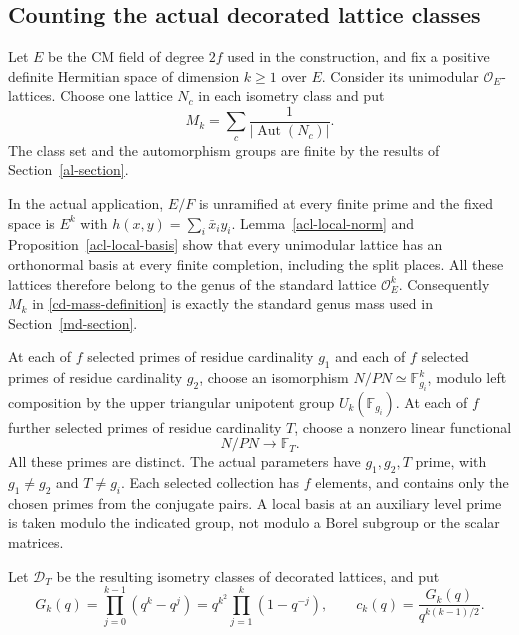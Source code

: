 \subsection{Counting the actual decorated lattice classes}

Let $E$ be the CM field of degree $2f$ used in the construction,
and fix a positive definite Hermitian space of dimension $k\ge1$
over $E$. Consider its unimodular $\mathcal O_E$-lattices.
Choose one lattice $N_c$ in each isometry class and put
\begin{equation}\label{cd-mass-definition}
                   M_k=\sum_c\frac1{|\operatorname{Aut}(N_c)|}.
\end{equation}
The class set and the automorphism groups are finite by the
results of Section~\ref{al-section}.

In the actual application, $E/F$ is unramified at every finite
prime and the fixed space is $E^k$ with
$h(x,y)=\sum_i\bar x_i y_i$. Lemma~\ref{acl-local-norm} and
Proposition~\ref{acl-local-basis} show that every unimodular
lattice has an orthonormal basis at every finite completion,
including the split places. All these lattices therefore belong
to the genus of the standard lattice $\mathcal O_E^k$.
Consequently $M_k$ in \eqref{cd-mass-definition} is exactly
the standard genus mass used in Section~\ref{md-section}.

At each of $f$ selected primes of residue cardinality $g_1$ and
each of $f$ selected primes of residue cardinality $g_2$, choose
an isomorphism $N/PN\simeq\mathbb F_{g_i}^{k}$, modulo left
composition by the upper triangular unipotent group
$U_k(\mathbb F_{g_i})$. At each of $f$ further selected primes
of residue cardinality $T$, choose a nonzero linear functional
\[
                         N/PN\longrightarrow\mathbb F_T.
\]
All these primes are distinct. The actual parameters have
$g_1,g_2,T$ prime, with $g_1\ne g_2$ and $T\ne g_i$.
Each selected collection has $f$ elements, and contains only
the chosen primes from the conjugate pairs. A local basis at an
auxiliary level prime is taken modulo the indicated group, not
modulo a Borel subgroup or the scalar matrices.

Let $\mathcal D_T$ be the resulting isometry classes of decorated
lattices, and put
\[
 G_k(q)=\prod_{j=0}^{k-1}(q^k-q^j)
       =q^{k^2}\prod_{j=1}^k(1-q^{-j}),\qquad
 c_k(q)=\frac{G_k(q)}{q^{k(k-1)/2}}.
\]

